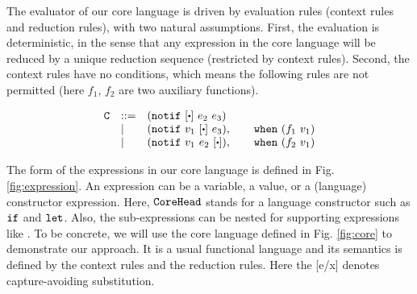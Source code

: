 The evaluator of our core language is driven by evaluation rules (context rules and reduction rules), with two natural assumptions. First, the evaluation is deterministic, in the sense that any expression in the core language will be reduced by a unique reduction sequence (restricted by context rules). Second, the context rules have no conditions, which means the following rules are not permitted (here $f_1$, $f_2$ are two auxiliary functions).

{\footnotesize
\[
\begin{array}{lll}
\m{C}& ::= & (\m{notif}~[\bigcdot]~e_2~e_3)\\
&|& (\m{notif}~v_1~[\bigcdot]~e_3), \qquad \m{when}~(f_1~v_1)\\
&|& (\m{notif}~v_1~e_2~[\bigcdot]), \qquad \m{when}~(f_2~v_1)
\end{array}
\]}

The form of the expressions in our core language is defined in Fig. \ref{fig:expression}. An expression can be a variable, a value, or a (language) constructor expression. Here, $\mbox{\tt CoreHead}$ stands for a language constructor such as $\mbox{\tt if}$ and $\mbox{\tt let}$. Also, the sub-expressions can be nested for supporting expressions like . To be concrete, we will use the core language defined in Fig.  \ref{fig:core} to demonstrate our approach. It is a usual functional language and its semantics is defined by the context rules and the reduction rules. Here the [e/x] denotes capture-avoiding substitution.

